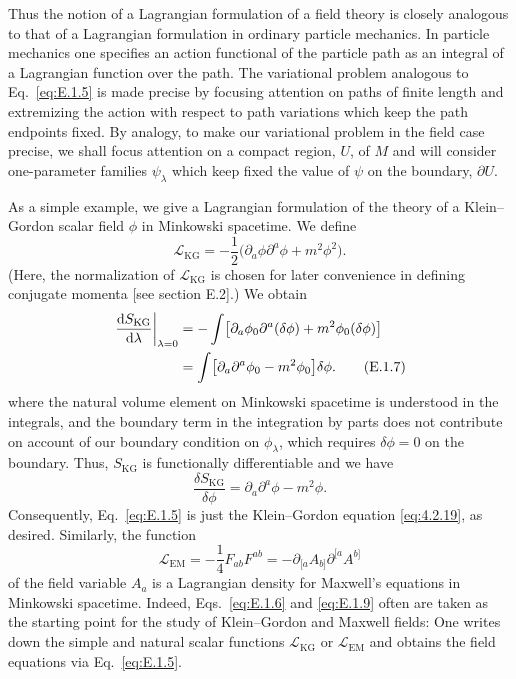 Thus the notion of a Lagrangian formulation of a field theory is closely analogous
to that of a Lagrangian formulation in ordinary particle mechanics. In particle
mechanics one specifies an action functional of the particle path as an integral of a
Lagrangian function over the path. The variational problem analogous to
Eq.~\eqref{eq:E.1.5} is made precise by focusing attention on paths of finite length
and extremizing the action with respect to path variations which keep the path
endpoints fixed. By analogy, to make our variational problem in the field case
precise, we shall focus attention on a compact region, \(U\), of \(M\) and will
consider one-parameter families \(\psi_\lambda\) which keep fixed the value of
\(\psi\) on the boundary, \(\partial U\).

As a simple example, we give a Lagrangian formulation of the theory of a
Klein--Gordon scalar field \(\phi\) in Minkowski spacetime. We define
\begin{equation}
  \mathcal L_{\mathrm{KG}}
    =-\frac{1}{2}\bigl(\partial_a\phi\partial^a\phi+m^2\phi^2\bigr).
  \tag{E.1.6}\label{eq:E.1.6}
\end{equation}
(Here, the normalization of \(\mathcal L_{\mathrm{KG}}\) is chosen for later
convenience in defining conjugate momenta [see section E.2].) We obtain
\begin{align}
  \left.\frac{\mathop{}\!\mathrm{d} S_{\mathrm{KG}}}{\mathop{}\!\mathrm{d}\lambda}\right|_{\lambda=0}
    &= -\int\bigl[\partial_a\phi_0\partial^a(\delta\phi)
        +m^2\phi_0(\delta\phi)\bigr] \notag\\
    &= \int\bigl[\partial_a\partial^a\phi_0-m^2\phi_0\bigr]\delta\phi .
  \tag{E.1.7}\label{eq:E.1.7}
\end{align}
where the natural volume element on Minkowski spacetime is understood in the
integrals, and the boundary term in the integration by parts does not contribute on
account of our boundary condition on \(\phi_\lambda\), which requires
\(\delta\phi=0\) on the boundary. Thus, \(S_{\mathrm{KG}}\) is functionally
differentiable and we have
\begin{equation}
  \frac{\delta S_{\mathrm{KG}}}{\delta\phi}
    =\partial_a\partial^a\phi-m^2\phi.
  \tag{E.1.8}\label{eq:E.1.8}
\end{equation}
Consequently, Eq.~\eqref{eq:E.1.5} is just the Klein--Gordon equation
\eqref{eq:4.2.19}, as desired. Similarly, the function
\begin{equation}
  \mathcal L_{\mathrm{EM}}
    =-\frac{1}{4}F_{ab}F^{ab}
    =-\partial_{[a}A_{b]}\partial^{[a}A^{b]}
  \tag{E.1.9}\label{eq:E.1.9}
\end{equation}
of the field variable \(A_a\) is a Lagrangian density for Maxwell's equations in
Minkowski spacetime. Indeed, Eqs.~\eqref{eq:E.1.6} and \eqref{eq:E.1.9} often
are taken as the starting point for the study of Klein--Gordon and Maxwell fields:
One writes down the simple and natural scalar functions \(\mathcal L_{\mathrm{KG}}\)
or \(\mathcal L_{\mathrm{EM}}\) and obtains the field equations via
Eq.~\eqref{eq:E.1.5}.

